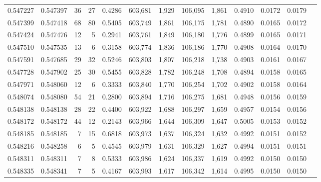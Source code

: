 \begin{tabular}{rrrrrrrrrrrrr}
0.547227 & 0.547397 &    36 &    27 &                                     0.4286 & 603,681 &   1,929 & 106,095 &   1,861 & 0.4910 & 0.0172 & 0.0179 \\
0.547399 & 0.547418 &    68 &    80 &                                     0.5405 & 603,749 &   1,861 & 106,175 &   1,781 & 0.4890 & 0.0165 & 0.0172 \\
0.547424 & 0.547476 &    12 &     5 &                                     0.2941 & 603,761 &   1,849 & 106,180 &   1,776 & 0.4899 & 0.0165 & 0.0171 \\
0.547510 & 0.547535 &    13 &     6 &                                     0.3158 & 603,774 &   1,836 & 106,186 &   1,770 & 0.4908 & 0.0164 & 0.0170 \\
0.547591 & 0.547685 &    29 &    32 &                                     0.5246 & 603,803 &   1,807 & 106,218 &   1,738 & 0.4903 & 0.0161 & 0.0167 \\
0.547728 & 0.547902 &    25 &    30 &                                     0.5455 & 603,828 &   1,782 & 106,248 &   1,708 & 0.4894 & 0.0158 & 0.0165 \\
0.547971 & 0.548060 &    12 &     6 &                                     0.3333 & 603,840 &   1,770 & 106,254 &   1,702 & 0.4902 & 0.0158 & 0.0164 \\
0.548074 & 0.548080 &    54 &    21 &                                     0.2800 & 603,894 &   1,716 & 106,275 &   1,681 & 0.4948 & 0.0156 & 0.0159 \\
0.548138 & 0.548138 &    28 &    22 &                                     0.4400 & 603,922 &   1,688 & 106,297 &   1,659 & 0.4957 & 0.0154 & 0.0156 \\
0.548172 & 0.548172 &    44 &    12 &                                     0.2143 & 603,966 &   1,644 & 106,309 &   1,647 & 0.5005 & 0.0153 & 0.0152 \\
0.548185 & 0.548185 &     7 &    15 &                                     0.6818 & 603,973 &   1,637 & 106,324 &   1,632 & 0.4992 & 0.0151 & 0.0152 \\
0.548216 & 0.548258 &     6 &     5 &                                     0.4545 & 603,979 &   1,631 & 106,329 &   1,627 & 0.4994 & 0.0151 & 0.0151 \\
0.548311 & 0.548311 &     7 &     8 &                                     0.5333 & 603,986 &   1,624 & 106,337 &   1,619 & 0.4992 & 0.0150 & 0.0150 \\
0.548335 & 0.548341 &     7 &     5 &                                     0.4167 & 603,993 &   1,617 & 106,342 &   1,614 & 0.4995 & 0.0150 & 0.0150 \\

\end{tabular}
